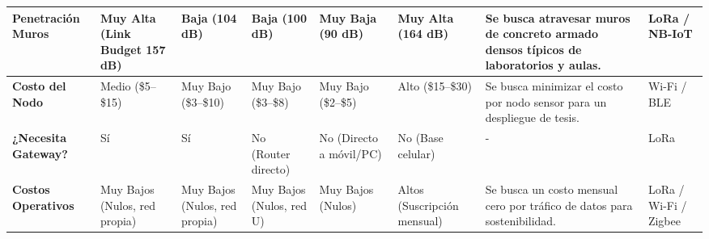 \begin{landscape}
\begin{table}[h!]
\begin{tabular}{|p{2.5cm}|p{2.5cm}|p{2cm}|p{2cm}|p{2.5cm}|p{2.5cm}|p{4.5cm}|p{2cm}|}
            \textbf{Penetración Muros}  & Muy Alta (Link Budget 157 dB)                     & Baja (104 dB)                                    & Baja (100 dB)                                & Muy Baja (90 dB)                           & Muy Alta (164 dB)                           & Se busca atravesar muros de concreto armado densos típicos de laboratorios y aulas.                               & LoRa / NB-IoT                               \\ \hline
            \textbf{Costo del Nodo}     & Medio (\$5--\$15)                                 & Muy Bajo (\$3--\$10)                             & Muy Bajo (\$3--\$8)                          & Muy Bajo (\$2--\$5)                        & Alto (\$15--\$30)                           & Se busca minimizar el costo por nodo sensor para un despliegue de tesis.                                          & Wi-Fi / BLE                                 \\ \hline
            \textbf{¿Necesita Gateway?} & Sí                                                & Sí                                               & No (Router directo)                          & No (Directo a móvil/PC)                    & No (Base celular)                           & -                                                                                                                 & LoRa                                        \\ \hline
            \textbf{Costos Operativos}  & Muy Bajos (Nulos, red propia)                     & Muy Bajos (Nulos, red propia)                    & Muy Bajos (Nulos, red U)                     & Muy Bajos (Nulos)                          & Altos (Suscripción mensual)                 & Se busca un costo mensual cero por tráfico de datos para sostenibilidad.                                          & LoRa / Wi-Fi / Zigbee                       \\ \hline
        \end{tabular}
    \end{table}
\end{landscape}
\FloatBarrier

